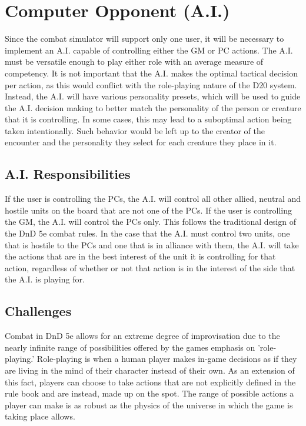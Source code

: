 \documentclass[12pt,a4paper]{report}
\begin{document}
\section{Computer Opponent (A.I.)}
	Since the combat simulator will support only one user, it will be necessary to implement an A.I. capable of controlling either the GM or PC actions. The A.I. must be versatile enough to play either role with an average measure of competency. It is not important that the A.I. makes the optimal tactical decision per action, as this would conflict with the role-playing nature of the D20 system. Instead, the A.I. will have various personality presets, which will be used to guide the A.I. decision making to better match the personality of the person or creature that it is controlling. In some cases, this may lead to a suboptimal action being taken intentionally. Such behavior would be left up to the creator of the encounter and the personality they select for each creature they place in it.
	
		\subsection{A.I. Responsibilities}
		If the user is controlling the PCs, the A.I. will control all other allied, neutral and hostile units on the board that are not one of the PCs. If the user is controlling the GM, the A.I. will control the PCs only. This follows the traditional design of the DnD 5e combat rules. In the case that the A.I. must control two units, one that is hostile to the PCs and one that is in alliance with them, the A.I. will take the actions that are in the best interest of the unit it is controlling for that action, regardless of whether or not that action is in the interest of the side that the A.I. is playing for. 
		
		\subsection{Challenges}
		Combat in DnD 5e allows for an extreme degree of improvisation due to the nearly infinite range of possibilities offered by the games emphasis on 'role-playing.' Role-playing is when a human player makes in-game decisions as if they are living in the mind of their character instead of their own. As an extension of this fact, players can choose to take actions that are not explicitly defined in the rule book and are instead, made up on the spot. The range of possible actions a player can make is as robust as the physics of the universe in which the game is taking place allows. 
		
\end{document}
